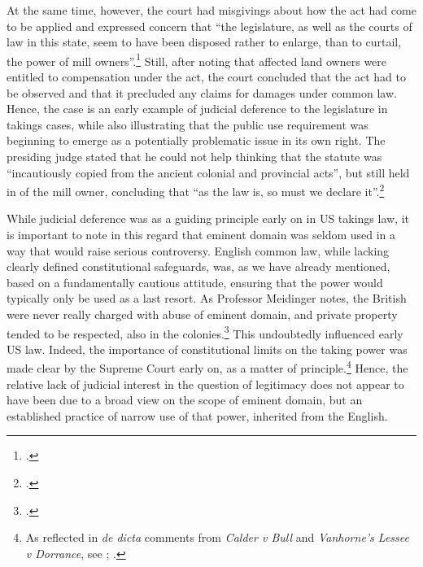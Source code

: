 At the same time, however, the court had misgivings about how the act had come to be applied and expressed concern that ``the legislature, as well as the courts of law in this state, seem to have been disposed rather to enlarge, than to curtail, the power of mill owners''.\footcite[366]{stowell14} Still, after noting that affected land owners were entitled to compensation under the act, the court concluded that the act had to be observed and that it precluded any claims for damages under common law. Hence, the case is an early example of judicial deference to the legislature in takings cases, while also illustrating that the public use requirement was beginning to emerge as a potentially problematic issue in its own right. The presiding judge stated that he could not help thinking that the statute was ``incautiously copied from the ancient colonial and provincial acts'', but still held in  of the mill owner,  concluding that ``as the law is, so must we declare it''.\footcite[368]{stowell14}

While judicial deference was  as a guiding principle early on in US takings law, it is important to note in this regard that eminent domain was seldom used in a way that would raise serious controversy. English common law, while lacking clearly defined constitutional safeguards, was, as we have already mentioned, based on a fundamentally cautious attitude, ensuring that the power would typically only be used as a last resort. As Professor Meidinger notes, the British were never really charged with abuse of eminent domain, and private property tended to be respected, also in the colonies.\footcite[17]{meidinger80} This undoubtedly influenced early US law. Indeed, the importance of constitutional limits on the taking power was made clear by the Supreme Court early on, as a matter of principle.\footnote{As reflected in {\it de dicta} comments from {\it Calder v Bull} and {\it Vanhorne’s Lessee v Dorrance}, see \cite[388]{calder98}; \cite[310]{vanhorne95}.} Hence, the relative lack of judicial interest in the question of legitimacy does not appear to have been due to a broad view on the scope of eminent domain, but an established practice of narrow use of that power, inherited from the English.

